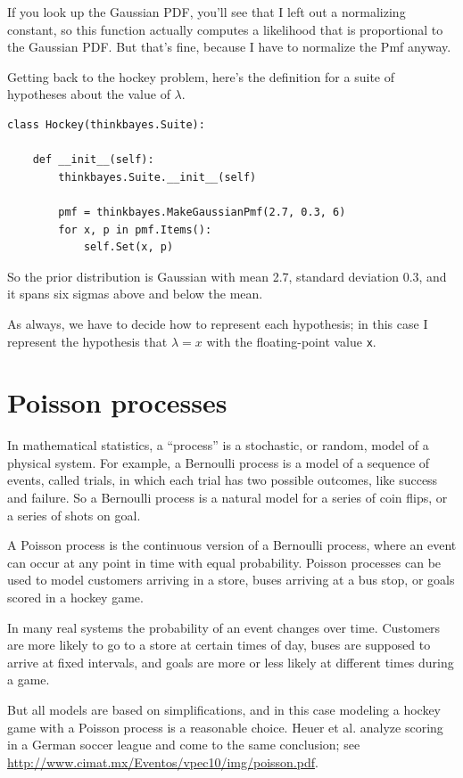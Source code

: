 \documentclass[12pt]{book}
\begin{document}
If you look up the Gaussian PDF, you'll see that I left out a
normalizing constant, so this function actually computes
a likelihood that is proportional to the Gaussian PDF.  But
that's fine, because I have to normalize the Pmf anyway.

Getting back to the hockey problem, here's the definition for a suite
of hypotheses about the value of $\lambda$.

\begin{verbatim}
class Hockey(thinkbayes.Suite):

    def __init__(self):
        thinkbayes.Suite.__init__(self)

        pmf = thinkbayes.MakeGaussianPmf(2.7, 0.3, 6)
        for x, p in pmf.Items():
            self.Set(x, p)
\end{verbatim}  

So the prior distribution is Gaussian with mean 2.7, standard deviation
0.3, and it spans six sigmas above and below the mean.

As always, we have to decide how to represent each hypothesis; in
this case I represent the hypothesis that $\lambda=x$ with the
floating-point value {\tt x}. 


\section{Poisson processes}

In mathematical statistics, a ``process'' is a stochastic, or random,
model of a physical system.  For example, a Bernoulli process is a model
of a sequence of events, called trials, in which each trial has
two possible outcomes, like success and failure.  So a Bernoulli
process is a natural model for a series of coin flips, or a series
of shots on goal.

A Poisson process is the continuous version of a Bernoulli process,
where an event can occur at any point in time with equal probability.
Poisson processes can be used to model customers arriving in a store,
buses arriving at a bus stop, or goals scored in a hockey game.

In many real systems the probability of an event changes over time.
Customers are more likely to go to a store at certain times of day,
buses are supposed to arrive at fixed intervals, and goals are more
or less likely at different times during a game.

But all models are based on simplifications, and in this case modeling
a hockey game with a Poisson process is a reasonable choice.  Heuer
et al. analyze scoring in a German soccer league and come to the same
conclusion; see
\url{http://www.cimat.mx/Eventos/vpec10/img/poisson.pdf}.
\end{document}
